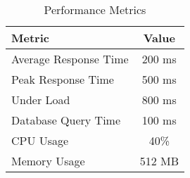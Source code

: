 \begin{table}[h]
    \centering
    \begin{tabular}{|l|c|}
        \hline
        \textbf{Metric} & \textbf{Value} \\
        \hline
        Average Response Time & 200 ms \\
        Peak Response Time & 500 ms \\
        Under Load & 800 ms \\
        Database Query Time & 100 ms \\
        CPU Usage & 40\% \\
        Memory Usage & 512 MB \\
        \hline
    \end{tabular}
    \caption{Performance Metrics}
    \label{tab:performance-metrics}
\end{table} 